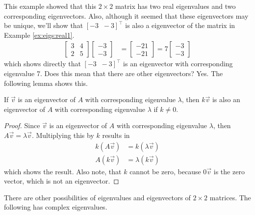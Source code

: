 This example showed that this $2 \times 2$ matrix has two real eigenvalues and two corresponding eigenvectors.  Also, although it seemed that these eigenvectors may be unique, we'll show that $[-3\;\;-3]^{\intercal}$ is also a eigenvector of the matrix in Example \ref{ex:eigs:real1}.  
%
\begin{align*}
\begin{bmatrix}
3 & 4 \\ 2 & 5 
\end{bmatrix}\begin{bmatrix}
-3 \\ -3 
\end{bmatrix} & = \begin{bmatrix}
-21 \\ -21 
\end{bmatrix} = 7 \begin{bmatrix}
-3 \\ -3
\end{bmatrix}
\end{align*}
which shows directly that $[-3\;\;-3]^{\intercal}$ is an eigenvector with corresponding eigenvalue 7.  Does this mean that there are other eigenvectors?  Yes.  The following lemma shows this. 

\begin{lemma} \label{lem:eigenvector:scale}
If $\vec{v}$ is an eigenvector of $A$ with corresponding eigenvalue $\lambda$, then $k\vec{v}$ is also an eigenvector of $A$ with corresponding eigenvalue $\lambda$ if $k \neq 0$. 
\end{lemma}

\begin{proof}
Since $\vec{v}$ is an eigenvector of $A$ with corresponding eigenvalue $\lambda$, then $A \vec{v} = \lambda \vec{v}$.  Multiplying this by $k$ results in
%
\begin{align*}
k(A \vec{v}) & = k (\lambda \vec{v}) \\
A (k \vec{v}) & = \lambda (k \vec{v})
\end{align*}
which shows the result.  Also note, that $k$ cannot be zero, because $0\vec{v}$ is the zero vector, which is not an eigenvector.  
\end{proof}




There are other possibilities of eigenvalues and eigenvectors of $2 \times 2$ matrices.    The following has complex eigenvalues.  




